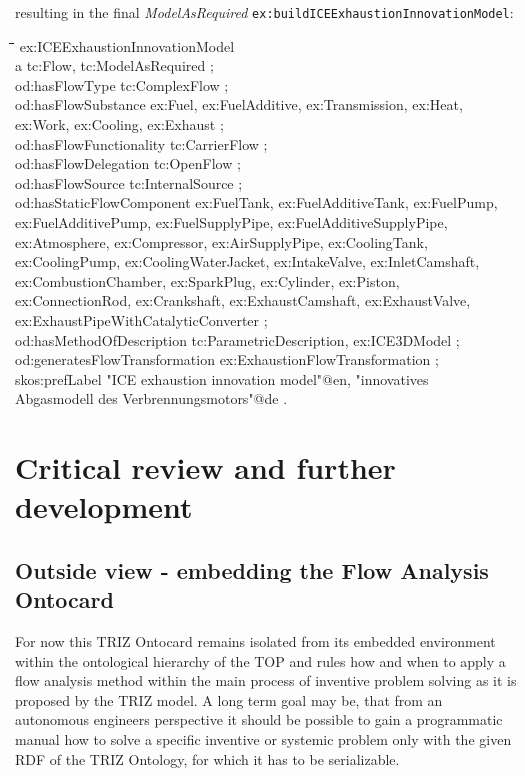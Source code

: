 \documentclass[a4paper,11pt]{article}
\newenvironment{code}{\tt \begin{tabbing}
\hskip12pt\=\hskip12pt\=\hskip12pt\=\hskip12pt\=\hskip5cm\=\hskip5cm\=\kill}
{\end{tabbing}}
\begin{document}
\begin{itemize}
    resulting in the final \emph{ModelAsRequired} 
    \texttt{ex:buildICEExhaustionInnovationModel}:
    \begin{code}
    ex:ICEExhaustionInnovationModel \\
    \> a tc:Flow, tc:ModelAsRequired ; \\
    \> od:hasFlowType tc:ComplexFlow ; \\
    \> od:hasFlowSubstance ex:Fuel, ex:FuelAdditive, ex:Transmission, ex:Heat,  \\
    \> ex:Work, ex:Cooling, ex:Exhaust ; \\
    \> od:hasFlowFunctionality tc:CarrierFlow ; \\
    \> od:hasFlowDelegation tc:OpenFlow ; \\
    \> od:hasFlowSource tc:InternalSource ; \\
    \> od:hasStaticFlowComponent ex:FuelTank, ex:FuelAdditiveTank, ex:FuelPump, \\
    \> ex:FuelAdditivePump, ex:FuelSupplyPipe, ex:FuelAdditiveSupplyPipe, \\
    \> ex:Atmosphere, ex:Compressor, ex:AirSupplyPipe, ex:CoolingTank, \\
    \> ex:CoolingPump, ex:CoolingWaterJacket, ex:IntakeValve, ex:InletCamshaft,\\
    \> ex:CombustionChamber, ex:SparkPlug, ex:Cylinder, ex:Piston, \\
    \> ex:ConnectionRod, ex:Crankshaft, ex:ExhaustCamshaft, ex:ExhaustValve,\\
    \> ex:ExhaustPipeWithCatalyticConverter ; \\
    \> od:hasMethodOfDescription tc:ParametricDescription, ex:ICE3DModel ; \\
    \> od:generatesFlowTransformation ex:ExhaustionFlowTransformation ; \\
    \> skos:prefLabel "ICE exhaustion innovation model"@en, "innovatives  \\
    \> Abgasmodell des Verbrennungsmotors"@de . \\
    \end{code}
    \newpage
    \section{Critical review and further development}
        \subsection{Outside view - embedding the Flow Analysis Ontocard}
        For now this TRIZ Ontocard remains isolated from its embedded environment within the ontological hierarchy of the TOP and rules how and when to 
        apply a flow analysis method within the main process of inventive problem solving as it is proposed by the TRIZ model. A long term goal may be,
        that from an autonomous engineers perspective it should be possible to gain a programmatic manual how to solve a specific inventive or systemic
        problem only with the given RDF of the TRIZ Ontology, for which it has to be serializable.


\end{itemize}
\end{document}
